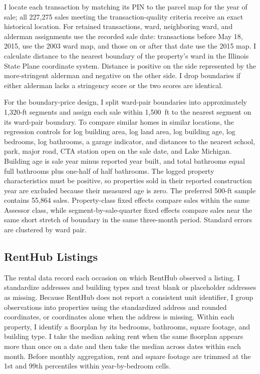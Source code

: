 I locate each transaction by matching its PIN to the parcel map for the year of sale; all 227,275 sales meeting the transaction-quality criteria receive an exact historical location.
For retained transactions, ward, neighboring ward, and alderman assignments use the recorded sale date: transactions before May 18, 2015, use the 2003 ward map, and those on or after that date use the 2015 map.
I calculate distance to the nearest boundary of the property's ward in the Illinois State Plane coordinate system.
Distance is positive on the side represented by the more-stringent alderman and negative on the other side.
I drop boundaries if either alderman lacks a stringency score or the two scores are identical.

For the boundary-price design, I split ward-pair boundaries into approximately 1,320-ft segments and assign each sale within 1,500~ft to the nearest segment on its ward-pair boundary.
To compare similar homes in similar locations, the regression controls for log building area, log land area, log building age, log bedrooms, log bathrooms, a garage indicator, and distances to the nearest school, park, major road, CTA station open on the sale date, and Lake Michigan.
Building age is sale year minus reported year built, and total bathrooms equal full bathrooms plus one-half of half bathrooms.
The logged property characteristics must be positive, so properties sold in their reported construction year are excluded because their measured age is zero.
The preferred 500-ft sample contains 55,864 sales.
Property-class fixed effects compare sales within the same Assessor class, while segment-by-sale-quarter fixed effects compare sales near the same short stretch of boundary in the same three-month period.
Standard errors are clustered by ward pair.

\subsection{RentHub Listings}
\label{subsec:renthub_sample}

The rental data record each occasion on which RentHub observed a listing.
I standardize addresses and building types and treat blank or placeholder addresses as missing.
Because RentHub does not report a consistent unit identifier, I group observations into properties using the standardized address and rounded coordinates, or coordinates alone when the address is missing.
Within each property, I identify a floorplan by its bedrooms, bathrooms, square footage, and building type.
I take the median asking rent when the same floorplan appears more than once on a date and then take the median across dates within each month.
Before monthly aggregation, rent and square footage are trimmed at the 1st and 99th percentiles within year-by-bedroom cells.

